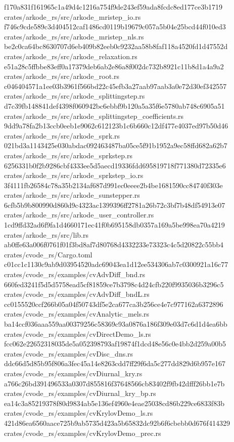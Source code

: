 \documentclass[
  10pt,
]{article}
\newenvironment{Shaded}{}{}
\newcommand{\NormalTok}[1]{#1}
\begin{document}
\begin{Shaded}
\begin{Highlighting}[]
\NormalTok{f170a831f161965c1a49d4c1216a754f9de243ef59ada8fcdc8ed177ce3b1719  crates/arkode\_rs/src/arkode\_mristep\_io.rs}
\NormalTok{f746c9cde589c3d404512caf1486cd0119b19679c057a5b04e25bcd44f010ed3  crates/arkode\_rs/src/arkode\_mristep\_nls.rs}
\NormalTok{be2c0ca64bc8630707d6eb409b82eeb0c9232aa58b8faf118a4520fd1d47552d  crates/arkode\_rs/src/arkode\_relaxation.rs}
\NormalTok{e51a28c5ffbbe83eff0a17379deb6ab2e86a8f002dc732b8921c11b8d1a4a9a2  crates/arkode\_rs/src/arkode\_root.rs}
\NormalTok{c046404571a1ee03b3961f566bd22c45efb3a27aab97aab3a0e72d30ef342557  crates/arkode\_rs/src/arkode\_splittingstep.rs}
\NormalTok{d7c39fb148841def4398f060942bc6ebbf9b120a5a35f6e5780ab748c6905a51  crates/arkode\_rs/src/arkode\_splittingstep\_coefficients.rs}
\NormalTok{9dd9a78fa2b13ccb0eeb1e9062c612123b1c6b660c12df477e4037ed97b50d46  crates/arkode\_rs/src/arkode\_sprk.rs}
\NormalTok{021bd3a1143425e030abdac092463487ba05ce5f91b1952a9ec58ffd682a62b7  crates/arkode\_rs/src/arkode\_sprkstep.rs}
\NormalTok{6256331b0f2b9286cbf4333ee5d5aecd19336fdd695819718f771380d72335e6  crates/arkode\_rs/src/arkode\_sprkstep\_io.rs}
\NormalTok{3f4111fb26584c78a35b2134af687d991ec0eeee2b4be1681590cc84740f303e  crates/arkode\_rs/src/arkode\_sunstepper.rs}
\NormalTok{6cfb5b9b800990d860d9c4323ac1399396ff2781a26b72c3bf7b48df54913e07  crates/arkode\_rs/src/arkode\_user\_controller.rs}
\NormalTok{1cd9ffd32ad6f9fa1d4660171ec41f0b695158db0357a169a5be998ea70a4219  crates/arkode\_rs/src/lib.rs}
\NormalTok{ab0ffe63a006f0761f01f3bd8af7d80768d4332233e73323c4c5d20822c55bb4  crates/cvode\_rs/Cargo.toml}
\NormalTok{c01cc1c1130c9ab9d03954520adc69043ea1d12ee534306ab7c0300921a16c77  crates/cvode\_rs/examples/cvAdvDiff\_bnd.rs}
\NormalTok{660fed3241f5d5d5758ead5cf81859ce7b3798c4d24cfb220f9935036b3296c5  crates/cvode\_rs/examples/cvAdvDiff\_bndL.rs}
\NormalTok{cc0155520ccf266b05a04f50743df5e2ca677ca3b256ce4e7c977162a6372896  crates/cvode\_rs/examples/cvAnalytic\_mels.rs}
\NormalTok{ba14ccf036aaa559aa00379256c58369c93a0876a186f309e03d7c6d1d4ea6bb  crates/cvode\_rs/examples/cvDirectDemo\_ls.rs}
\NormalTok{fcc062e22652318035de5a052398793af19874f1dcd48e56c0e4bb2d259a00b5  crates/cvode\_rs/examples/cvDisc\_dns.rs}
\NormalTok{ddc66d5d85b95f806a3fec45a14e8263cdd7ff29f6da5c277dd829d6b957e167  crates/cvode\_rs/examples/cvDiurnal\_kry.rs}
\NormalTok{a766c26bd391496533a0307d855816f37648566cb83402f9fb42dfff26bb1e7b  crates/cvode\_rs/examples/cvDiurnal\_kry\_bp.rs}
\NormalTok{ea14c3a85219378f80d9834ab5e136ef4960e4eae25038cd86b229ce6833f83b  crates/cvode\_rs/examples/cvKrylovDemo\_ls.rs}
\NormalTok{421d86ea6560aace725b9ab5735d423a5b65832dc92b6f6cbebb0d676f414329  crates/cvode\_rs/examples/cvKrylovDemo\_prec.rs}

\end{Highlighting}
\end{Shaded}
\end{document}
